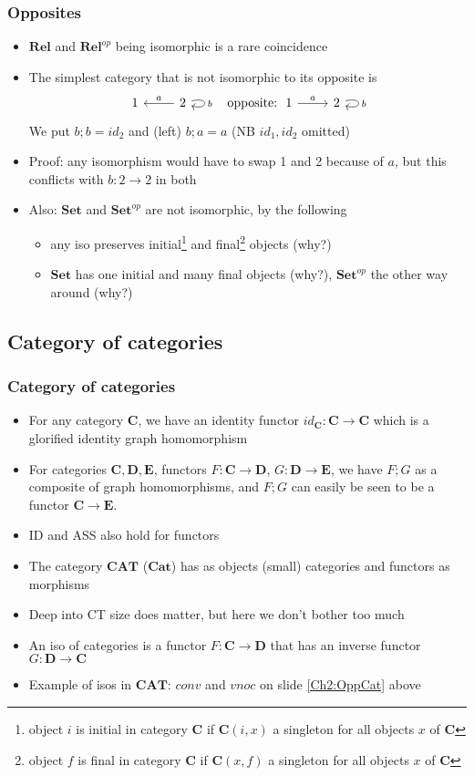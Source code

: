 \documentclass[handout]{beamer}
\newcommand{\bfsf}[1]{{\boldsymbol{#1}}}
\newcommand{\Set}{\bfsf{Set}}
\newcommand{\CC}{\bfsf{C}}
\newcommand{\DD}{\bfsf{D}}
\newcommand{\EE}{\bfsf{E}}
\newcommand{\Rel}{\bfsf{Rel}}
\newcommand{\Cat}{\bfsf{Cat}}
\newcommand{\CAT}{\bfsf{CAT}}
\begin{document}
\begin{frame}[fragile]
     
    \frametitle{Opposites}\label{Ch2:Opposites}

 \begin{itemize}[<+->]
\item $\Rel$ and $\Rel^{op}$ being isomorphic is a rare coincidence
\item The simplest category that is not isomorphic to its opposite is
\[
\begin{tikzcd}
1 & 2  \arrow[swap]{l}{a} \arrow[loop right]{l}{b} &\text{opposite:}~~
1 \arrow{r}{a} & 2   \arrow[loop right]{l}{b} 
\end{tikzcd}
\]
We put $b;b = id_2$ and (left) $b;a = a$ (NB $id_1,id_2$ omitted)
\item
Proof: any isomorphism would have to swap 1 and 2 because of $a$,
but this conflicts with $b: 2\to 2$ in both
\item Also: $\Set$ and $\Set^{op}$ are not isomorphic, by the following
   \begin{itemize}[<+->]
\item any iso preserves initial\footnote{%
object $i$ is initial in category $\CC$ if $\CC(i,x)$ a singleton for all objects $x$ of $\CC$} 
and final\footnote{%
object $f$ is final in category $\CC$ if $\CC(x,f)$ a singleton for all objects $x$ of $\CC$}
objects (why?)
\item  $\Set$ has one initial and many final objects (why?),  
$\Set^{op}$ the other way around (why?)
   \end{itemize}

 \end{itemize}
\end{frame}


\subsection{Category of categories}

\frame
  {   
    \frametitle{Category of categories}\label{Ch2:CatofCats}

 \begin{itemize}[<+->]
\item For any category $\CC$, we have an identity functor $id_\CC : \CC\to\CC$ 
which is a glorified identity graph homomorphism
\item For categories $\CC,\DD,\EE$, functors $F:\CC\to\DD$, $G:\DD\to\EE$,
we have $F;G$ as a composite of graph homomorphisms, and $F;G$ can easily
be seen to be a functor $\CC\to\EE$.
\item ID and ASS also hold for functors
\item The category $\CAT$ ($\Cat$) has as objects (small) categories
and functors as morphisms
\item Deep into CT size does matter, but here we don't bother too much 
\item An iso of categories is a functor $F: \CC\to\DD$ that has an 
inverse functor $G:\DD\to\CC$
\item Example of isos in $\CAT$: $conv$ and $vnoc$ on slide \ref{Ch2:OppCat} above
 \end{itemize}

 }
\end{document}
